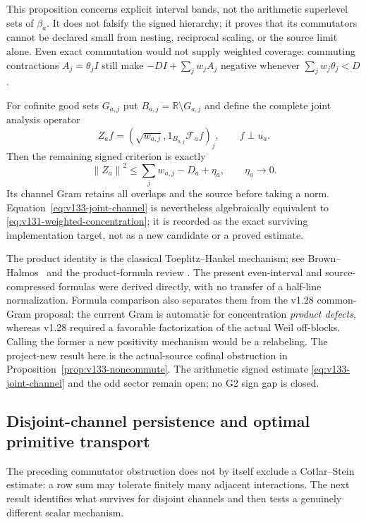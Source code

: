 \documentclass[11pt]{article}
\theoremstyle{remark}
\newcommand{\norm}[1]{\left\lVert #1\right\rVert}
\begin{document}
This proposition concerns explicit interval bands, not the arithmetic
superlevel sets of $\beta_a$.  It does not falsify the signed hierarchy;
it proves that its commutators cannot be declared small from nesting,
reciprocal scaling, or the source limit alone.  Even exact commutation
would not supply weighted coverage: commuting contractions
$A_j=\theta_jI$ still make $-DI+\sum_jw_jA_j$ negative whenever
$\sum_jw_j\theta_j<D$.

For cofinite good sets $G_{a,j}$ put $B_{a,j}=\mathbb R\setminus G_{a,j}$
and define the complete joint analysis operator
\[
 Z_af=(\sqrt{w_{a,j}},1_{B_{a,j}}\mathcal F_af)_j,
 \qquad f\perp u_a.
\]
Then the remaining signed criterion is exactly
\begin{equation}
 \norm{Z_a}^2
 \le\sum_jw_{a,j}-D_a+\eta_a,
 \qquad \eta_a\longrightarrow0.\label{eq:v133-joint-channel}
\end{equation}
Its channel Gram retains all overlaps and the source before taking a
norm.  Equation~\eqref{eq:v133-joint-channel} is nevertheless
algebraically equivalent to \eqref{eq:v131-weighted-concentration}; it
is recorded as the exact surviving implementation target, not as a new
candidate or a proved estimate.

The product identity is the classical Toeplitz--Hankel mechanism; see
Brown--Halmos~\cite{BrownHalmos1964} and the product-formula review
\cite{Virtanen2022}.  The present even-interval and source-compressed
formulas were derived directly, with no transfer of a half-line
normalization.  Formula comparison also separates them from the v1.28
common-Gram proposal: the current Gram is automatic for concentration
\emph{product defects}, whereas v1.28 required a favorable factorization
of the actual Weil off-blocks.  Calling the former a new positivity
mechanism would be a relabeling.  The project-new result here is the
actual-source cofinal obstruction in
Proposition~\ref{prop:v133-noncommute}.  The arithmetic signed estimate
\eqref{eq:v133-joint-channel} and the odd sector remain open; no G2 sign
gap is closed.

\subsection*{Disjoint-channel persistence and optimal primitive transport}

The preceding commutator obstruction does not by itself exclude a
Cotlar--Stein estimate: a row sum may tolerate finitely many adjacent
interactions.  The next result identifies what survives for disjoint
channels and then tests a genuinely different scalar mechanism.
\end{document}
